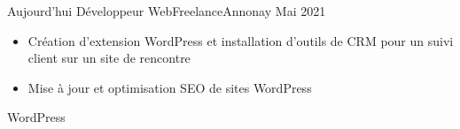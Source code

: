 %
%
%

\begin{experiences}
  \experience
    {Aujourd'hui}   {Développeur Web}{Freelance}{Annonay}
    {Mai 2021} {
                      \begin{itemize}
                        \item Création d'extension WordPress et installation d'outils de CRM pour un suivi client sur un site de rencontre
                        \item Mise à jour et optimisation SEO de sites WordPress
                      \end{itemize}
                    }
                    {WordPress}


\end{experiences}
